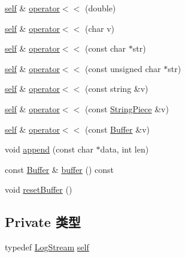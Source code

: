 \begin{DoxyCompactItemize}
\item 
\hyperlink{classmuduo_1_1LogStream_a85e87a809801549b949fc3f7f8c816bd}{self} \& \hyperlink{classmuduo_1_1LogStream_aa4fea7ce9aa4664e692f6ee596e3b120}{operator$<$$<$} (double)
\item 
\hyperlink{classmuduo_1_1LogStream_a85e87a809801549b949fc3f7f8c816bd}{self} \& \hyperlink{classmuduo_1_1LogStream_a8803799af07bd0890101f153d5008893}{operator$<$$<$} (char v)
\item 
\hyperlink{classmuduo_1_1LogStream_a85e87a809801549b949fc3f7f8c816bd}{self} \& \hyperlink{classmuduo_1_1LogStream_a9f2b169c885db34149ac9eccb84fd5a7}{operator$<$$<$} (const char $\ast$str)
\item 
\hyperlink{classmuduo_1_1LogStream_a85e87a809801549b949fc3f7f8c816bd}{self} \& \hyperlink{classmuduo_1_1LogStream_a910024b9a941ed5cd3a44fa74cbd3204}{operator$<$$<$} (const unsigned char $\ast$str)
\item 
\hyperlink{classmuduo_1_1LogStream_a85e87a809801549b949fc3f7f8c816bd}{self} \& \hyperlink{classmuduo_1_1LogStream_ab2a8c0318c56545dcf3b4193dccd9814}{operator$<$$<$} (const string \&v)
\item 
\hyperlink{classmuduo_1_1LogStream_a85e87a809801549b949fc3f7f8c816bd}{self} \& \hyperlink{classmuduo_1_1LogStream_ae05e1c88b77ce178b75cb47185fd4894}{operator$<$$<$} (const \hyperlink{classmuduo_1_1StringPiece}{String\+Piece} \&v)
\item 
\hyperlink{classmuduo_1_1LogStream_a85e87a809801549b949fc3f7f8c816bd}{self} \& \hyperlink{classmuduo_1_1LogStream_a2113666d07badb201263a185c1186132}{operator$<$$<$} (const \hyperlink{classmuduo_1_1LogStream_ad711cf53b5df9fac2d62ecd2b9a8f763}{Buffer} \&v)
\item 
void \hyperlink{classmuduo_1_1LogStream_ad01a92f970117814c81b686b871558bc}{append} (const char $\ast$data, int len)
\item 
const \hyperlink{classmuduo_1_1LogStream_ad711cf53b5df9fac2d62ecd2b9a8f763}{Buffer} \& \hyperlink{classmuduo_1_1LogStream_a78bcd01119fe550b2a28f8f7aedb828a}{buffer} () const
\item 
void \hyperlink{classmuduo_1_1LogStream_a8765f1344e57db0a3e0c798c9ac6a1fe}{reset\+Buffer} ()
\end{DoxyCompactItemize}
\subsection*{Private 类型}
\begin{DoxyCompactItemize}
\item 
typedef \hyperlink{classmuduo_1_1LogStream}{Log\+Stream} \hyperlink{classmuduo_1_1LogStream_a85e87a809801549b949fc3f7f8c816bd}{self}
\end{DoxyCompactItemize}
